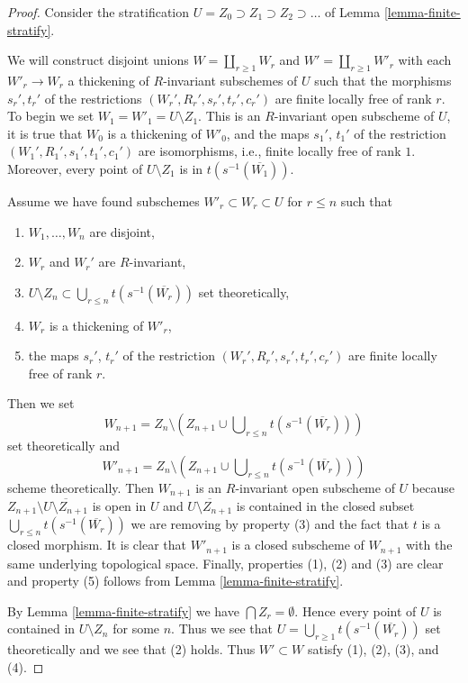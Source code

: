 \documentclass{stacks-project}
\theoremstyle{plain}
\theoremstyle{definition}
\theoremstyle{remark}
\numberwithin{equation}{subsection}
\begin{document}
\begin{proof}
Consider the stratification $U = Z_0 \supset Z_1 \supset Z_2 \supset \ldots$
of Lemma \ref{lemma-finite-stratify}.

\medskip\noindent
We will construct disjoint unions $W = \coprod_{r \geq 1} W_r$ and
$W' = \coprod_{r \geq 1} W'_r$ with each $W'_r \to W_r$ a thickening
of $R$-invariant subschemes of $U$ such that the morphisms
$s_r', t_r'$ of the restrictions $(W_r', R_r', s_r', t_r', c_r')$
are finite locally free of rank $r$. To begin we set
$W_1 = W'_1 = U \setminus Z_1$. This is an $R$-invariant open
subscheme of $U$, it is true that $W_0$ is a thickening of $W'_0$,
and the maps $s_1'$, $t_1'$ of the
restriction $(W_1', R_1', s_1', t_1', c_1')$ are isomorphisms, i.e.,
finite locally free of rank $1$.
Moreover, every point of $U \setminus Z_1$ is in $t(s^{-1}(\overline{W_1}))$.

\medskip\noindent
Assume we have found subschemes $W'_r \subset W_r \subset U$ for $r \leq n$
such that
\begin{enumerate}
\item $W_1, \ldots, W_n$ are disjoint,
\item $W_r$ and $W_r'$ are $R$-invariant,
\item $U \setminus Z_n \subset \bigcup_{r \leq n} t(s^{-1}(\overline{W_r}))$
set theoretically,
\item $W_r$ is a thickening of $W'_r$,
\item the maps $s_r'$, $t_r'$ of the restriction
$(W_r', R_r', s_r', t_r', c_r')$ are finite locally free of rank $r$.
\end{enumerate}
Then we set
$$
W_{n + 1} = Z_n \setminus
\left(
Z_{n + 1} \cup \bigcup\nolimits_{r \leq n} t(s^{-1}(\overline{W_r}))
\right)
$$
set theoretically and
$$
W'_{n + 1} = Z_n \setminus
\left(
Z_{n + 1} \cup \bigcup\nolimits_{r \leq n} t(s^{-1}(\overline{W_r}))
\right)
$$
scheme theoretically. Then $W_{n + 1}$ is an $R$-invariant open subscheme
of $U$ because $Z_{n + 1} \setminus \overline{U \setminus Z_{n + 1}}$
is open in $U$ and $\overline{U \setminus Z_{n + 1}}$ is contained
in the closed subset $\bigcup\nolimits_{r \leq n} t(s^{-1}(\overline{W_r}))$
we are removing by property (3) and the fact that $t$ is a closed morphism.
It is clear that $W'_{n + 1}$ is a closed subscheme
of $W_{n + 1}$ with the same underlying topological space.
Finally, properties (1), (2) and (3) are clear and property (5) follows from
Lemma \ref{lemma-finite-stratify}.

\medskip\noindent
By Lemma \ref{lemma-finite-stratify} we have $\bigcap Z_r = \emptyset$.
Hence every point of $U$ is contained in $U \setminus Z_n$
for some $n$. Thus we see that
$U = \bigcup_{r \geq 1} t(s^{-1}(\overline{W_r}))$
set theoretically and we see that (2) holds.
Thus $W' \subset W$ satisfy (1), (2), (3), and (4).
\end{proof}
\end{document}
